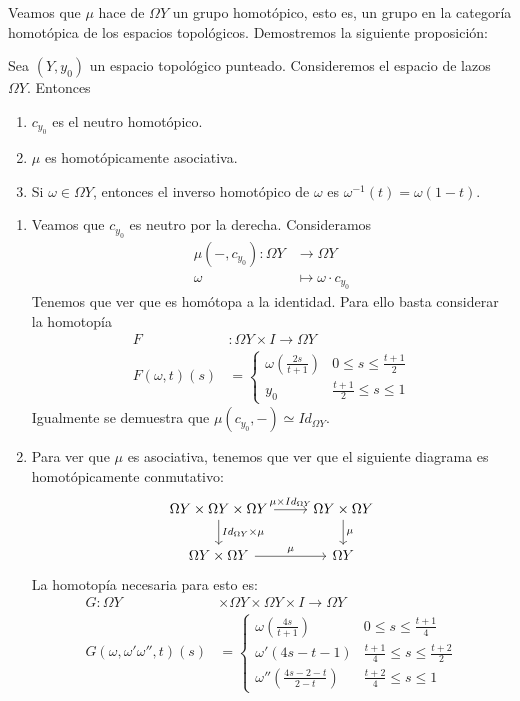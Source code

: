 Veamos que $\mu$ hace de $\Omega Y$ un grupo homotópico, esto es, un grupo en la categoría homotópica de los espacios topológicos. Demostremos la siguiente proposición:
\begin{prop}
Sea $(Y, y_0)$ un espacio topológico punteado. Consideremos el espacio de lazos $\Omega Y$. Entonces
\begin{enumerate}
\item $c_{y_0}$ es el neutro homotópico.
\item $\mu$ es homotópicamente asociativa.
\item Si $\omega \in \Omega Y$, entonces el inverso homotópico de $\omega$ es $\omega^{-1}(t) = \omega(1 - t)$.
\end{enumerate}
\end{prop}
\begin{demo}
\begin{enumerate}
\item Veamos que $c_{y_0}$ es neutro por la derecha. Consideramos
\begin{align*}
\mu(-,c_{y_0}) : \Omega Y &\longrightarrow \Omega Y \\
\omega &\longmapsto \omega \cdotp c_{y_0}
\end{align*}
Tenemos que ver que es homótopa a la identidad. Para ello basta considerar la homotopía
\begin{align*}
F&: \Omega Y \times I \longrightarrow \Omega Y \\
F(\omega, t)(s) &= 
\begin{cases}
\omega\left(\frac{2s}{t+1}\right) & 0 \leq s \leq \frac{t+1}{2} \\
y_0													& \frac{t+1}{2} \leq s \leq 1
\end{cases}
\end{align*}
Igualmente se demuestra que $\mu(c_{y_0}, -) \simeq Id_{\Omega Y}$.
\item Para ver que $\mu$ es asociativa, tenemos que ver que el siguiente diagrama es homotópicamente conmutativo: 
\[
\begin{tikzcd}
	\Omega Y \times \Omega Y \times \Omega Y \rar{\mu \times Id_{\Omega Y}} \dar{Id_{\Omega Y} \times \mu}
		  & \Omega Y \times \Omega Y \dar{\mu} \\
	\Omega Y \times \Omega Y \rar{\mu} 
		  & \Omega Y
\end{tikzcd}
\]
La homotopía necesaria para esto es:
\begin{align*}
G: 	\Omega Y &\times \Omega Y \times \Omega Y \times I \longrightarrow \Omega Y \\
G(\omega, \omega' \omega'', t)(s) &= 
\begin{cases}
\omega \left( \frac{4s}{t+1}\right) & 0 \leq s \leq \frac{t+1}{4} \\
\omega'(4s - t - 1)         		 & \frac{t+1}{4} \leq s \leq \frac{t+2}{2} \\
\omega''\left( \frac{4s -2 - t}{2-t}\right) & \frac{t+2}{4} \leq s \leq 1
\end{cases}
\end{align*}


\end{enumerate}
\end{demo}

